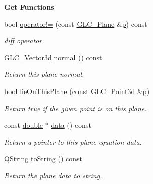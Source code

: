\begin{Indent}{\bf Get Functions}
\begin{DoxyCompactItemize}
bool \hyperlink{class_g_l_c___plane_ae54b8a92cfc0346fef06505de47ecea7}{operator!=} (const \hyperlink{class_g_l_c___plane}{G\-L\-C\-\_\-\-Plane} \&\hyperlink{glext_8h_aa5367c14d90f462230c2611b81b41d23}{p}) const 
\begin{DoxyCompactList}\small\item\em diff operator \end{DoxyCompactList}\item 
\hyperlink{class_g_l_c___vector3d}{G\-L\-C\-\_\-\-Vector3d} \hyperlink{class_g_l_c___plane_aa06b8755a25fd36ef2dd8664a72c5152}{normal} () const 
\begin{DoxyCompactList}\small\item\em Return this plane normal. \end{DoxyCompactList}\item 
bool \hyperlink{class_g_l_c___plane_a92ed16e60b079d5e4fe6fb4215e0a5d5}{lie\-On\-This\-Plane} (const \hyperlink{glc__vector3d_8h_a4e13a9bbc7ab3d34de7e98b41836772c}{G\-L\-C\-\_\-\-Point3d} \&\hyperlink{glext_8h_aa5367c14d90f462230c2611b81b41d23}{p})
\begin{DoxyCompactList}\small\item\em Return true if the given point is on this plane. \end{DoxyCompactList}\item 
const \hyperlink{_super_l_u_support_8h_a8956b2b9f49bf918deed98379d159ca7}{double} $\ast$ \hyperlink{class_g_l_c___plane_abcbedd27ca4264ce0c0bb3bd43ef4423}{data} () const 
\begin{DoxyCompactList}\small\item\em Return a pointer to this plane equation data. \end{DoxyCompactList}\item 
\hyperlink{group___u_a_v_objects_plugin_gab9d252f49c333c94a72f97ce3105a32d}{Q\-String} \hyperlink{class_g_l_c___plane_a4752aafe7cdcf43d27d187814faea4c5}{to\-String} () const 
\begin{DoxyCompactList}\small\item\em Return the plane data to string. \end{DoxyCompactList}\end{DoxyCompactItemize}
\end{Indent}
